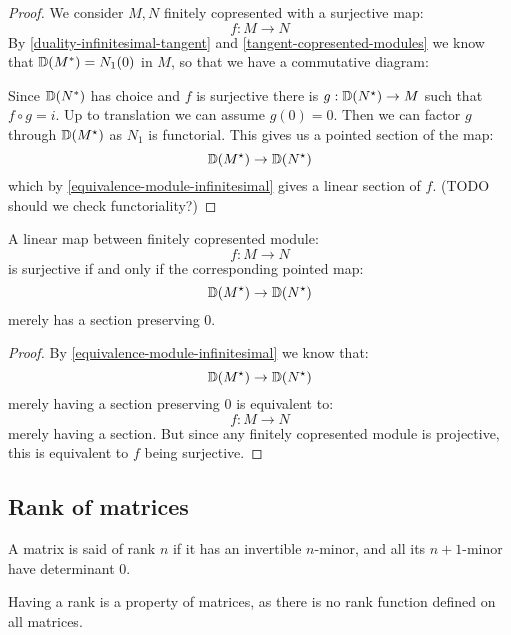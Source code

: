 \begin{proof}
We consider $M,N$ finitely copresented with a surjective map:
\[f:M\to N\]
By \cref{duality-infinitesimal-tangent} and \cref{tangent-copresented-modules} we know that $\mathbb{D}(M^*) = N_1(0)$ in $M$, so that we have a commutative diagram:
\begin{center}
\end{center}
Since $\mathbb{D}(N^*)$ has choice and $f$ is surjective there is $g:\mathbb{D}(N^\star)\to M$ such that $f\circ g = i$. Up to translation we can assume $g(0) = 0$.
Then we can factor $g$ through $\mathbb{D}(M^\star)$ as $N_1$ is functorial. This gives us a pointed section of the map:
\[\mathbb{D}(M^\star) \to \mathbb{D}(N^\star)\]
which by \cref{equivalence-module-infinitesimal} gives a linear section of $f$. (TODO should we check functoriality?)
\end{proof}

\begin{lemma}\label{neighborhood-tangent-correspondence-smooth}
A linear map between finitely copresented module:
\[f:M\to N\]
is surjective if and only if the corresponding pointed map:
\[\mathbb{D}(M^\star) \to \mathbb{D}(N^\star)\]
merely has a section preserving $0$.
\end{lemma}

\begin{proof}
By \cref{equivalence-module-infinitesimal} we know that:
\[\mathbb{D}(M^\star) \to \mathbb{D}(N^\star)\]
merely having a section preserving $0$ is equivalent to:
\[f:M\to N\]
merely having a section. But since any finitely copresented module is projective, this is equivalent to $f$ being surjective.
\end{proof}


\subsection{Rank of matrices}

\begin{definition}
A matrix is said of rank $n$ if it has an invertible $n$-minor, and all its $n+1$-minor have determinant $0$.
\end{definition}

Having a rank is a property of matrices, as there is no rank function defined on all matrices.

